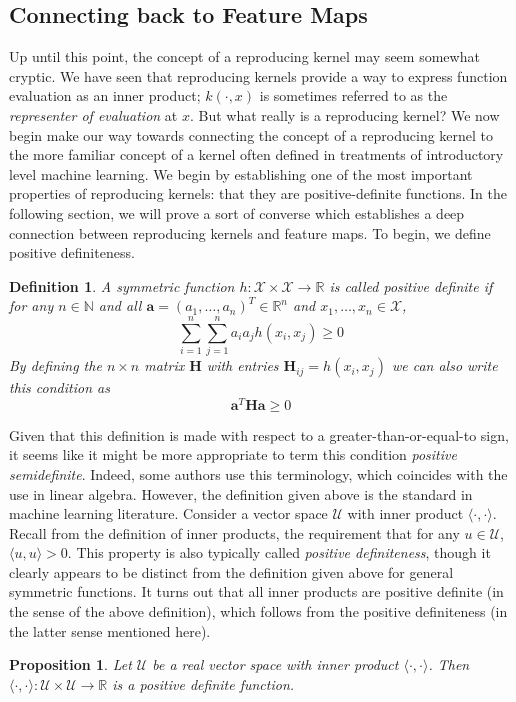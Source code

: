 \documentclass[12pt]{article}
\newcommand{\R}{\mathbb{R}}
\newtheorem{definition}{Definition}
\newtheorem{prop}{Proposition}
\begin{document}
\subsection{Connecting back to Feature Maps}
 Up until this point, the concept of a reproducing kernel may seem somewhat cryptic. We have seen that reproducing kernels provide a way to express function evaluation as an inner product; 
 $k(\cdot, x)$ is sometimes referred to as the \textit{representer of evaluation} at $x$. But what really is a reproducing kernel? We now begin make our way towards connecting the concept of a 
 reproducing kernel to the more familiar concept of a kernel often defined in treatments of introductory level machine learning. We begin by establishing one of the most important properties of 
 reproducing kernels: that they are positive-definite functions. In the following section, we will prove a sort of converse which establishes a deep connection between reproducing kernels and 
 feature maps. To begin, we define positive definiteness. 
 \begin{definition}
 A symmetric function $h: \mathcal{X} \times \mathcal{X} \to \R$ is called positive definite if for any $n \in \mathbb{N}$ and all $\mathbf{a} = (a_1, \dots, a_n)^T \in \R^n$ and 
 $x_1, \dots, x_n \in \mathcal{X}$, 
 \[\sum_{i = 1}^{n} \sum_{j = 1}^{n} a_i a_j h(x_i, x_j) \geq 0\]
 By defining the $n \times n$ matrix $\mathbf{H}$ with entries $\mathbf{H}_{ij} = h(x_i, x_j)$ we can also write this condition as 
 \[\mathbf{a}^T \mathbf{H} \mathbf{a} \geq 0\]
 \end{definition}
 Given that this definition is made with respect to a greater-than-or-equal-to sign, it seems like it might be more appropriate to term this condition \textit{positive semidefinite}. Indeed, some authors 
 use this terminology, which coincides with the use in linear algebra. However, the definition given above is the standard in machine learning literature. Consider a vector space $\mathcal{U}$ with inner product 
 $\langle \cdot, \cdot \rangle$. Recall from the definition of inner products, the requirement that for any $u \in \mathcal{U}$, $\langle u, u \rangle > 0$. This property is also typically 
 called \textit{positive definiteness}, though it clearly appears to be distinct from the definition given above for general symmetric functions. It turns out that all inner products are positive definite (in the sense of 
 the above definition), which follows from the positive definiteness (in the latter sense mentioned here). 
 \begin{prop}
 Let $\mathcal{U}$ be a real vector space with inner product $\langle \cdot, \cdot \rangle$. Then 
 $\langle \cdot, \cdot \rangle: \mathcal{U} \times \mathcal{U} \to \R$ is a positive definite function. 
 \end{prop} 
\end{document}
